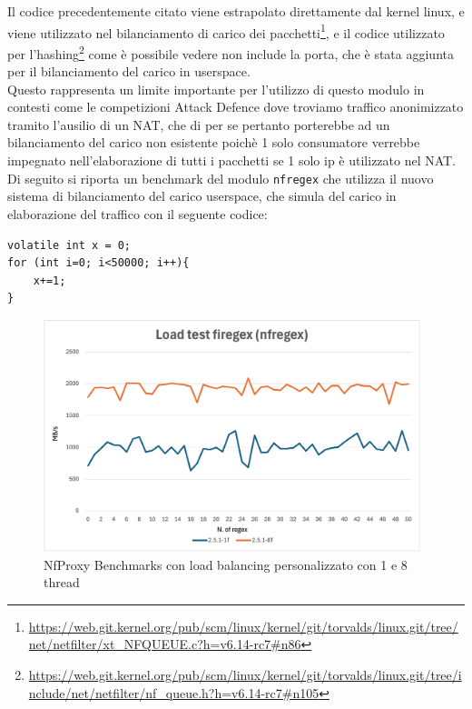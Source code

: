 Il codice precedentemente citato viene estrapolato direttamente dal kernel linux, e 
viene utilizzato nel bilanciamento di carico dei pacchetti\footnote{\url{https://web.git.kernel.org/pub/scm/linux/kernel/git/torvalds/linux.git/tree/net/netfilter/xt_NFQUEUE.c?h=v6.14-rc7\#n86}},
e il codice utilizzato per l'hashing\footnote{\url{https://web.git.kernel.org/pub/scm/linux/kernel/git/torvalds/linux.git/tree/include/net/netfilter/nf_queue.h?h=v6.14-rc7\#n105}}
come è possibile vedere non include la porta, che è stata aggiunta per il bilanciamento del carico in userspace.\\

Questo rappresenta un limite importante per l'utilizzo di questo modulo in contesti come le competizioni Attack Defence dove
troviamo traffico anonimizzato tramito l'ausilio di un NAT, che di per se pertanto porterebbe
ad un bilanciamento del carico non esistente poichè 1 solo consumatore verrebbe impegnato nell'elaborazione di tutti i pacchetti
se 1 solo ip è utilizzato nel NAT.\\
Di seguito si riporta un benchmark del modulo \texttt{nfregex} che utilizza il nuovo sistema di bilanciamento del carico userspace,
che simula del carico in elaborazione del traffico con il seguente codice:

\begin{listing}[H]
    \begin{verbatim}
volatile int x = 0;
for (int i=0; i<50000; i++){
    x+=1;
}
\end{verbatim}
\end{listing}

\begin{figure}[H]
    \centering
    \includegraphics[width=0.98\textwidth]{images/chapter3/Benchmark-chart-with-load.png}
    \caption{NfProxy Benchmarks con load balancing personalizzato con 1 e 8 thread}\label{fig:nfproxy_multithread_benchmark}
\end{figure}

